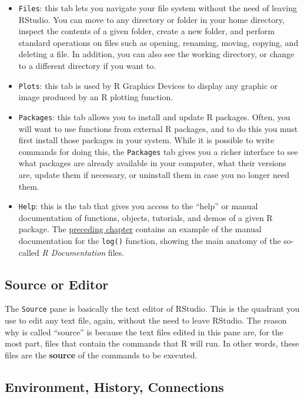 \documentclass[
]{book}
\begin{document}
\begin{itemize}
\item
  \texttt{Files}: this tab lets you navigate your file system without the need of
  leaving RStudio. You can move to any directory or folder in your home directory,
  inspect the contents of a given folder, create a new folder, and perform
  standard operations on files such as opening, renaming, moving, copying, and
  deleting a file. In addition, you can also see the working directory, or change
  to a different directory if you want to.
\item
  \texttt{Plots}: this tab is used by R Graphics Devices to display any graphic or
  image produced by an R plotting function.
\item
  \texttt{Packages}: this tab allows you to install and update R packages. Often, you
  will want to use functions from external R packages, and to do this you must
  first install those packages in your system. While it is possible to write
  commands for doing this, the \texttt{Packages} tab gives you a richer interface to
  see what packages are already available in your computer, what their versions
  are, update them if necessary, or uninstall them in case you no longer need them.
\item
  \texttt{Help}: this is the tab that gives you access to the ``help'' or manual
  documentation of functions, objects, tutorials, and demos of a given R package.
  The \protect\hyperlink{help-documentation}{preceding chapter} contains an example of the
  manual documentation for the \texttt{log()} function, showing the main anatomy of the
  so-called \emph{R Documentation} files.
\end{itemize}

\hypertarget{source-or-editor}{%
\subsection{Source or Editor}\label{source-or-editor}}

The \texttt{Source} pane is basically the text editor of RStudio. This is the quadrant
you use to edit any text file, again, without the need to leave RStudio.
The reason why is called ``source'' is because the text files edited in this
pane are, for the most part, files that contain the commands that R will
run. In other words, these files are the \textbf{source} of the commands to be
executed.

\hypertarget{environment-history-connections}{%
\subsection{Environment, History, Connections}\label{environment-history-connections}}
\end{document}
